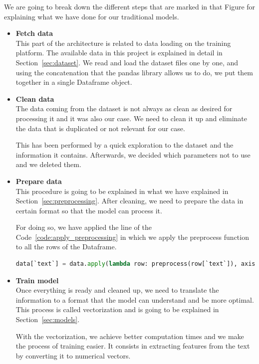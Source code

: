 We are going to break down the different steps that are marked in that Figure for explaining what we have done for our traditional models.

\begin{itemize}
    \item \textbf{Fetch data}\\
    This part of the architecture is related to data loading on the training platform. The available data in this project is explained in detail in Section~\ref{sec:dataset}. We read and load the dataset files one by one, and using the concatenation that the pandas library allows us to do, we put them together in a single Dataframe object.
    
    \item \textbf{Clean data}\\
    The data coming from the dataset is not always as clean as desired for processing it and it was also our case. We need to clean it up and eliminate the data that is duplicated or not relevant for our case.

    This has been performed by a quick exploration to the dataset and the information it contains. Afterwards, we decided which parameters not to use and we deleted them.
    
    \item \textbf{Prepare data}\\
    This procedure is going to be explained in what we have explained in Section~\ref{sec:preprocessing}. After cleaning, we need to prepare the data in certain format so that the model can process it.
    
    For doing so, we have applied the line of the Code~\ref{code:apply_preprocessing} in which we apply the preprocess function to all the rows of the Dataframe.
    \begin{lstlisting}[language=Python, caption={Preprocessing application}, label={code:apply_preprocessing}]
        data[`text`] = data.apply(lambda row: preprocess(row[`text`]), axis=1)
    \end{lstlisting}
    
    \item \textbf{Train model}\\
    Once everything is ready and cleaned up, we need to translate the information to a format that the model can understand and be more optimal. This process is called vectorization and is going to be explained in Section~\ref{sec:models}.

    With the vectorization, we achieve better computation times and we make the process of training easier. It consists in extracting features from the text by converting it to numerical vectors.


\end{itemize}
